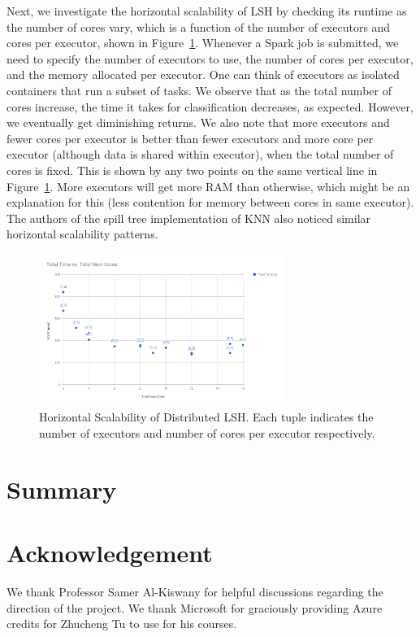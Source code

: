 \documentclass[letterpaper,twocolumn,10pt]{article}
\theoremstyle{definition}
\begin{document}
Next, we investigate the horizontal scalability of LSH by checking its runtime as the number of cores 
vary, which is a function of the number of executors and cores per executor, shown in 
Figure~\ref{figure:scalability}. Whenever a Spark job is submitted, we need to specify the number of 
executors to use, the number of cores per executor, and the memory allocated per executor. One can 
think of executors as isolated containers that run a subset of tasks. We observe that as the total 
number of cores increase, the time it takes for classification decreases, as expected. However, we 
eventually get diminishing returns. We also note that more executors and fewer cores per executor is 
better than fewer executors and more core per executor (although data is shared within executor), 
when the total number of cores is fixed. This is shown by any two points on the same vertical line in 
Figure~\ref{figure:scalability}. More executors will get more RAM than otherwise, which might be an 
explanation for this (less contention for memory between cores in same executor). The authors of the 
spill tree implementation of KNN also noticed similar horizontal scalability patterns.

\begin{figure}[t]
	\center
	\includegraphics[width=8cm]{scalability.png}
	\caption{Horizontal Scalability of Distributed LSH. Each tuple indicates the number of executors and 
	number of cores per executor respectively.}
	\label{figure:scalability}
\end{figure}

\section{Summary}



\section*{Acknowledgement}
We thank Professor Samer Al-Kiswany for helpful discussions regarding the direction 
of the project. We thank Microsoft for graciously providing Azure credits for 
Zhucheng Tu to use for his courses.
{\footnotesize 
}
\end{document}
